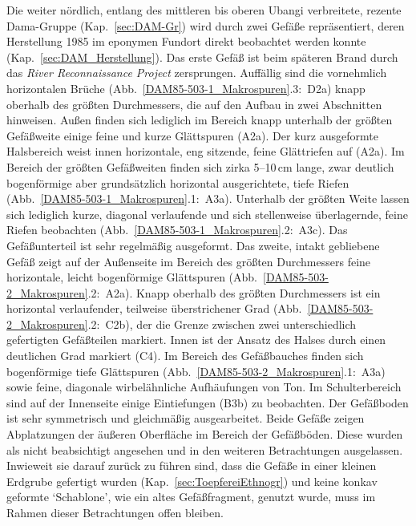 Die weiter nördlich, entlang des mittleren bis oberen Ubangi verbreitete, rezente Dama-Gruppe (Kap.~\ref{sec:DAM-Gr}) wird durch zwei Gefäße repräsentiert, deren Herstellung 1985 im eponymen Fundort direkt beobachtet werden konnte (Kap.~\ref{sec:DAM_Herstellung}). Das erste Gefäß ist beim späteren Brand durch das \textit{River Reconnaissance Project} zersprungen. Auffällig sind die vornehmlich horizontalen Brüche (Abb.~\ref{DAM85-503-1_Makrospuren}.3:~D2a) knapp oberhalb des größten Durchmessers, die auf den Aufbau in zwei Abschnitten hinweisen. Außen finden sich lediglich im Bereich knapp unterhalb der größten Gefäßweite einige feine und kurze Glättspuren (A2a). Der kurz ausgeformte Halsbereich weist innen horizontale, eng sitzende, feine Glättriefen auf (A2a). Im Bereich der größten Gefäßweiten finden sich zirka 5--10\,cm lange, zwar deutlich bogenförmige aber grundsätzlich horizontal ausgerichtete, tiefe Riefen (Abb.~\ref{DAM85-503-1_Makrospuren}.1:~A3a). Unterhalb der größten Weite lassen sich lediglich kurze, diagonal verlaufende und sich stellenweise überlagernde, feine Riefen beobachten (Abb.~\ref{DAM85-503-1_Makrospuren}.2:~A3c). Das Gefäßunterteil ist sehr regelmäßig ausgeformt.	Das zweite, intakt gebliebene Gefäß zeigt auf der Außenseite im Bereich des größten Durchmessers feine horizontale, leicht bogenförmige Glättspuren (Abb.~\ref{DAM85-503-2_Makrospuren}.2:~A2a). Knapp oberhalb des größten Durchmessers ist ein horizontal verlaufender, teilweise überstrichener Grad (Abb.~\ref{DAM85-503-2_Makrospuren}.2:~C2b), der die Grenze zwischen zwei unterschiedlich gefertigten Gefäßteilen markiert. Innen ist der Ansatz des Halses durch einen deutlichen Grad markiert (C4). Im Bereich des Gefäßbauches finden sich bogenförmige tiefe Glättspuren (Abb.~\ref{DAM85-503-2_Makrospuren}.1:~A3a) sowie feine, diagonale wirbelähnliche Aufhäufungen von Ton. Im Schulterbereich sind auf der Innenseite einige Eintiefungen (B3b) zu beobachten. Der Gefäßboden ist sehr symmetrisch und gleichmäßig ausgearbeitet. Beide Gefäße zeigen Abplatzungen der äußeren Oberfläche im Bereich der Gefäßböden. Diese wurden als nicht beabsichtigt angesehen und in den weiteren Betrachtungen ausgelassen. Inwieweit sie darauf zurück zu führen sind, dass die Gefäße in einer kleinen Erdgrube gefertigt wurden (Kap.~\ref{sec:ToepfereiEthnogr}) und keine konkav geformte \enquote*{Schablone}, wie ein altes Gefäßfragment, genutzt wurde, muss im Rahmen dieser Betrachtungen offen bleiben.

